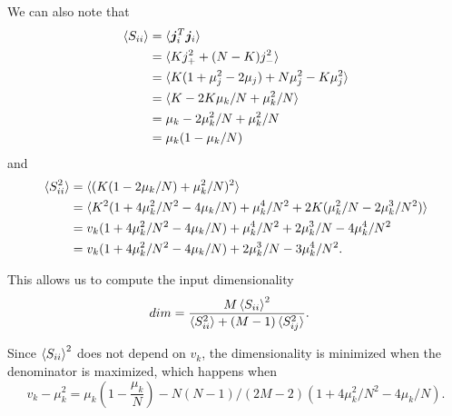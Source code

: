 \documentclass{article}
\renewcommand\b\bm
\begin{document}
We can also note that
\begin{align}
    \braket{S_{ii}} &= \braket{\b{j}_i^T \b{j}_i}\\
    &= \braket{K j_+^2 + (N-K) j_-^2}\\
    &= \braket{K (1 + \mu_j^2 - 2 \mu_j)  + N \mu_j^2 - K \mu_j^2}\\
    &= \braket{K - 2 K \mu_k/N + \mu_k^2/N}\\
    &= \mu_k - 2 \mu_k^2/N + \mu_k^2 / N\\
    &= \mu_k (1 - \mu_k / N)
\end{align}
and
\begin{align}
    \braket{S_{ii}^2} &= \braket{(K(1 - 2 \mu_k/N) + \mu_k^2/N)^2}\\
    &= \braket{K^2(1 + 4 \mu_k^2 / N^2 - 4 \mu_k/N) + \mu_k^4/N^2 + 2 K (\mu_k^2/N - 2 \mu_k^3/N^2)}\\
    &= v_k(1 + 4 \mu_k^2 / N^2 - 4 \mu_k/N) + \mu_k^4/N^2 + 2 \mu_k^3/N - 4 \mu_k^4/N^2\\
    &= v_k(1 + 4 \mu_k^2 / N^2 - 4 \mu_k/N) + 2 \mu_k^3/N - 3 \mu_k^4/N^2.
\end{align}

This allows us to compute the input dimensionality
\begin{align}
    dim &= \frac{M \braket{S_{ii}}^2}{\braket{S_{ii}^2} + (M-1) \braket{S_{ij}^2}}.
\end{align}

Since $\braket{S_{ii}}^2$ does not depend on $v_k$, the dimensionality is minimized when the denominator is maximized, which happens when
\begin{equation}
    v_k - \mu_k^2 = \mu_k ( 1 - \frac{\mu_k}{N}) - N(N-1)/(2M-2) (1 + 4 \mu_k^2 / N^2 - 4 \mu_k/N).
\end{equation}
\end{document}
